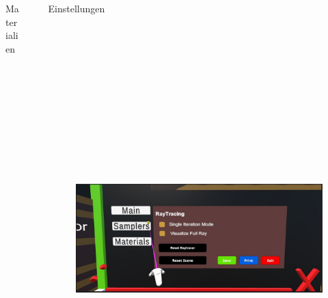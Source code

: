 \documentclass[final,hyperref={pdfpagelabels=false}]{beamer}
\begin{document}
\begin{frame}[t]
\begin{columns}[t]
\begin{column}{.465\textwidth}
\begin{block}{Materialien}

\end{block}


\end{column} %



\begin{column}{.025\textwidth}\end{column} %

\begin{column}{.465\textwidth}

\begin{block}{Einstellungen}
   \begin{figure}
   	  \includegraphics[height=16.5cm]{settings}
   \end{figure}
   

\end{block}
\end{column}
\end{columns}
\end{frame}
\end{document}
